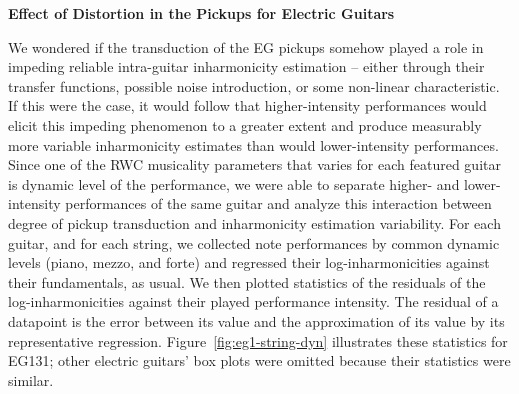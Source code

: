 \documentclass[12pt]{cmuthesis}
\begin{document}
\textbf{Effect of Distortion in the Pickups for Electric Guitars}

We wondered if the transduction of the EG pickups somehow played a role in impeding reliable intra-guitar inharmonicity estimation -- either through their transfer functions, possible noise introduction, or some non-linear characteristic. If this were the case, it would follow that higher-intensity performances would elicit this impeding phenomenon to a greater extent and produce measurably more variable inharmonicity estimates than would lower-intensity performances. Since one of the RWC musicality parameters that varies for each featured guitar is dynamic level of the performance, we were able to separate higher- and lower-intensity performances of the same guitar and analyze this interaction between degree of pickup transduction and inharmonicity estimation variability. For each guitar, and for each string, we collected note performances by common dynamic levels (piano, mezzo, and forte) and regressed their log-inharmonicities against their fundamentals, as usual. We then plotted statistics of the residuals of the log-inharmonicities against their played performance intensity. The residual of a datapoint is the error between its value and the approximation of its value by its representative regression. Figure~\ref{fig:eg1-string-dyn} illustrates these statistics for EG131; other electric guitars' box plots were omitted because their statistics were similar.
\end{document}
